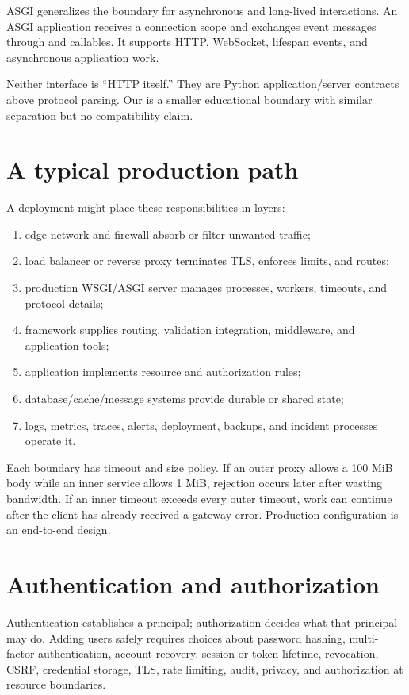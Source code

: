 ASGI generalizes the boundary for asynchronous and long-lived interactions. An
ASGI application receives a connection scope and exchanges event messages through
 and  callables. It supports HTTP, WebSocket, lifespan
events, and asynchronous application work.

Neither interface is ``HTTP itself.'' They are Python application/server contracts
above protocol parsing. Our  is a
smaller educational boundary with similar separation but no compatibility claim.

\section{A typical production path}

A deployment might place these responsibilities in layers:

\begin{enumerate}
  \item edge network and firewall absorb or filter unwanted traffic;
  \item load balancer or reverse proxy terminates TLS, enforces limits, and routes;
  \item production WSGI/ASGI server manages processes, workers, timeouts, and protocol details;
  \item framework supplies routing, validation integration, middleware, and application tools;
  \item application implements resource and authorization rules;
  \item database/cache/message systems provide durable or shared state;
  \item logs, metrics, traces, alerts, deployment, backups, and incident processes operate it.
\end{enumerate}

Each boundary has timeout and size policy. If an outer proxy allows a 100 MiB
body while an inner service allows 1 MiB, rejection occurs later after wasting
bandwidth. If an inner timeout exceeds every outer timeout, work can continue
after the client has already received a gateway error. Production configuration
is an end-to-end design.

\section{Authentication and authorization}

Authentication establishes a principal; authorization decides what that principal
may do. Adding users safely requires choices about password hashing, multi-factor
authentication, account recovery, session or token lifetime, revocation, CSRF,
credential storage, TLS, rate limiting, audit, privacy, and authorization at
resource boundaries.

